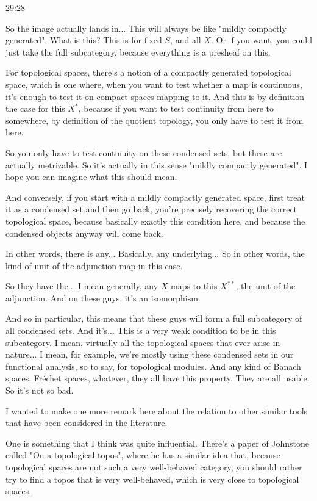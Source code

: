 \begin{example}
\begin{unfinished}{29:28}
\begin{remark}
So the image actually lands in... This will always be like "mildly compactly generated". What is this? This is for fixed $S$, and all $X$. Or if you want, you could just take the full subcategory, because everything is a presheaf on this.

For topological spaces, there's a notion of a compactly generated topological space, which is one where, when you want to test whether a map is continuous, it's enough to test it on compact spaces mapping to it. And this is by definition the case for this $X^*$, because if you want to test continuity from here to somewhere, by definition of the quotient topology, you only have to test it from here.

So you only have to test continuity on these condensed sets, but these are actually metrizable. So it's actually in this sense "mildly compactly generated". I hope you can imagine what this should mean.

And conversely, if you start with a mildly compactly generated space, first treat it as a condensed set and then go back, you're precisely recovering the correct topological space, because basically exactly this condition here, and because the condensed objects anyway will come back.

In other words, there is any... Basically, any underlying... So in other words, the kind of unit of the adjunction map in this case.

So they have the... I mean generally, any $X$ maps to this $X^{**}$, the unit of the adjunction. And on these guys, it's an isomorphism.

And so in particular, this means that these guys will form a full subcategory of all condensed sets. And it's... This is a very weak condition to be in this subcategory. I mean, virtually all the topological spaces that ever arise in nature... I mean, for example, we're mostly using these condensed sets in our functional analysis, so to say, for topological modules. And any kind of Banach spaces, Fréchet spaces, whatever, they all have this property. They are all usable. So it's not so bad.


\begin{remark}
I wanted to make one more remark here about the relation to other similar tools that have been considered in the literature.

One is something that I think was quite influential. There's a paper of Johnstone called "On a topological topos", \citeme{} where he has a similar idea that, because topological spaces are not such a very well-behaved category, you should rather try to find a topos that is very well-behaved, which is very close to topological spaces.


\end{remark}
\end{remark}
\end{unfinished}
\end{example}
